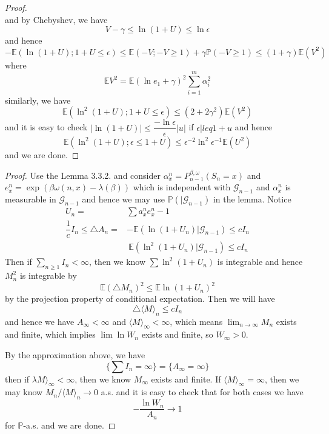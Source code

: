 \begin{proof}
\[    \]
    and by Chebyshev, we have
    \[
    V - \gamma \leq \ln(1+U) \leq \ln \epsilon
    \]
    and hence
    \[
    -\mathbb{E}(\ln(1+U);1+U\leq \epsilon) \leq \mathbb{E}(-V; -V \geq 1) + \gamma\mathbb{P}(-V\geq 1) \leq (1+\gamma)\mathbb{E}(V^2)
    \]
    where
    \[
    \mathbb{E}V^2 = \mathbb{E}(\ln e_1+\gamma)^2 \sum\limits_{i=1}^m \alpha_i^2
    \]
    similarly, we have
    \[
    \mathbb{E}(\ln^2(1+U); 1+U\leq \epsilon) \leq (2+2\gamma^2)\mathbb{E}(V^2)
    \]
    and it is easy to check $|\ln(1+U)| \leq \dfrac{-\ln\epsilon}{\epsilon}|u|$ if $\epsilon |leq 1+u$ and hence
    \[
    \mathbb{E}(\ln^2(1+U); \epsilon \leq 1+U) \leq \epsilon^{-2}\ln^2{\epsilon^{-1}}\mathbb{E}(U^2)
    \]
    and we are done.
\end{proof}

\begin{proof}
    Use the Lemma 3.3.2. and consider $\alpha^n_x = P_{n-1}^{\beta, \omega}(S_n = x)$ and $e_x^n = \exp(\beta\omega(n,x) - \lambda(\beta))$ which is independent with $\mathcal{G}_{n-1}$ and $\alpha_x^n$ is measurable in $\mathcal{G}_{n-1}$ and hence we may use $\mathbb{P}(|\mathcal{G}_{n-1})$ in the lemma. Notice
    \[
    \begin{aligned}
        U_n = &\sum a^n_x e^n_x - 1 \\
        \dfrac{1}{c}I_n \leq \triangle A_n = &-\mathbb{E}(\ln(1+U_n)|\mathcal{G}_{n-1}) \leq cI_n \\
        &\ \mathbb{E}(\ln^2(1+U_n)|\mathcal{G}_{n-1}) \leq cI_n
    \end{aligned}
    \]
    Then if $\sum\limits_{n\geq 1} I_n < \infty$, then we know $\sum\ln^2(1+U_n)$ is integrable and hence $M_n^2$ is integrable by
    \[
    \mathbb{E}(\triangle M_n)^2 \leq \mathbb{E}\ln(1+U_n)^2
    \]
    by the projection property of conditional expectation. Then we will have
    \[
    \triangle \langle M\rangle_n \leq cI_n
    \]
    and hence we have $A_{\infty} < \infty$ and $\langle M \rangle_{\infty} < \infty$, which means $\lim_{n\to\infty} M_n$ exists and finite, which implies $\lim \ln W_n$ exists and finite, so $W_{\infty} > 0$.\par
    By the approximation above, we have
    \[
    \{\sum I_n = \infty\} = \{A_{\infty} = \infty\}
    \]
    then if $\lambda M \rangle_{\infty} < \infty$, then we know $M_{\infty}$ exists and finite. If $\langle M\rangle_{\infty} = \infty$, then we may know $M_n/\langle M\rangle_n \to 0$ a.s. and it is easy to check that for both cases we have
    \[-\dfrac{\ln W_n}{A_n} \to 1\]
    for $\mathbb{P}$-a.s. and we are done.
\end{proof}

